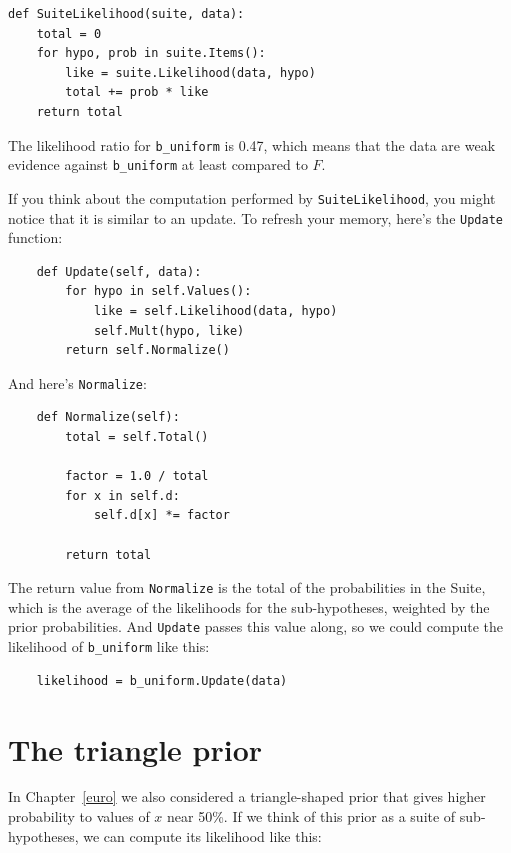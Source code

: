 \documentclass[12pt]{book}
\begin{document}
\begin{verbatim}
def SuiteLikelihood(suite, data):
    total = 0
    for hypo, prob in suite.Items():
        like = suite.Likelihood(data, hypo)
        total += prob * like
    return total
\end{verbatim}

The likelihood ratio for \verb"b_uniform" is 0.47, which means
that the data are weak evidence against \verb"b_uniform" at
least compared to $F$.

If you think about the computation performed by
\verb"SuiteLikelihood", you might notice that it is similar to an
update.  To refresh your memory, here's the {\tt Update} function:

\begin{verbatim}
    def Update(self, data):
        for hypo in self.Values():
            like = self.Likelihood(data, hypo)
            self.Mult(hypo, like)
        return self.Normalize()
\end{verbatim}

And here's {\tt Normalize}:

\begin{verbatim}
    def Normalize(self):
        total = self.Total()
        
        factor = 1.0 / total
        for x in self.d:
            self.d[x] *= factor

        return total
\end{verbatim}

The return value from {\tt Normalize} is the total of the probabilities
in the Suite, which is the average of the likelihoods for the
sub-hypotheses, weighted by the prior probabilities.  And {\tt Update}
passes this value along, so we could compute the likelihood
of \verb"b_uniform" like this:

\begin{verbatim}
    likelihood = b_uniform.Update(data)
\end{verbatim}



\section{The triangle prior}

In Chapter~\ref{euro} we also considered a triangle-shaped prior that
gives higher probability to values of $x$ near 50\%.  If we think of
this prior as a suite of sub-hypotheses, we can compute its likelihood
like this:
\end{document}
